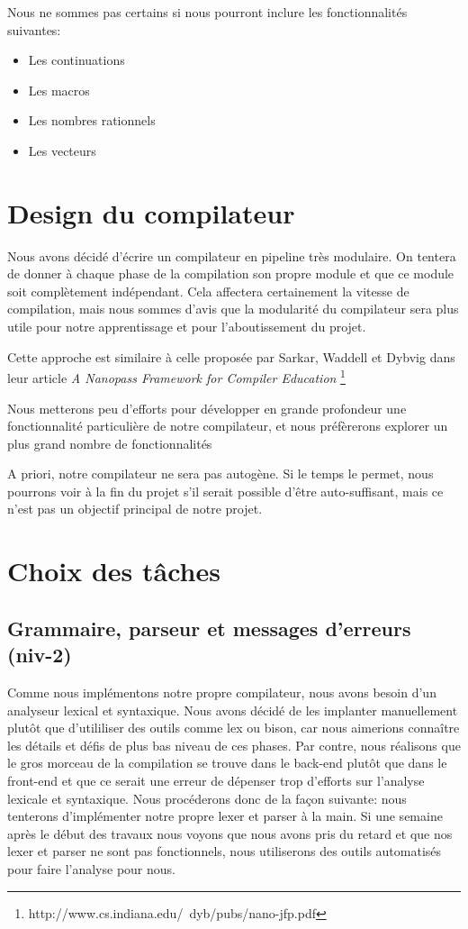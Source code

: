 \documentclass[11pt]{article}
\begin{document}
Nous ne sommes pas certains si nous pourront inclure les
fonctionnalités suivantes:

\begin{itemize}
\item Les continuations
\item Les macros
\item Les nombres rationnels
\item Les vecteurs
\end{itemize}


\section{Design du compilateur}

Nous avons décidé d'écrire un compilateur en pipeline très modulaire.
On tentera de donner à chaque phase de la compilation son propre
module et que ce module soit complètement indépendant.  Cela affectera
certainement la vitesse de compilation, mais nous sommes d'avis que la
modularité du compilateur sera plus utile pour notre apprentissage et
pour l'aboutissement du projet.

Cette approche est similaire à celle proposée par Sarkar, Waddell et
Dybvig dans leur article \emph{A Nanopass Framework for Compiler
  Education} \footnote{http://www.cs.indiana.edu/~dyb/pubs/nano-jfp.pdf}

Nous metterons peu d'efforts pour développer en grande profondeur une
fonctionnalité particulière de notre compilateur, et nous préfèrerons
explorer un plus grand nombre de fonctionnalités

A priori, notre compilateur ne sera pas autogène.  Si le temps le
permet, nous pourrons voir à la fin du projet s'il serait possible
d'être auto-suffisant, mais ce n'est pas un objectif principal de
notre projet.

\section{Choix des tâches}

\subsection{Grammaire, parseur et messages d'erreurs (niv-2)}

Comme nous implémentons notre propre compilateur, nous avons besoin
d'un analyseur lexical et syntaxique.  Nous avons décidé de les
implanter manuellement plutôt que d'utililiser des outils comme lex ou
bison, car nous aimerions connaître les détails et défis de plus bas
niveau de ces phases.  Par contre, nous réalisons que le gros morceau
de la compilation se trouve dans le back-end plutôt que dans le
front-end et que ce serait une erreur de dépenser trop d'efforts sur
l'analyse lexicale et syntaxique.  Nous procéderons donc de la façon
suivante: nous tenterons d'implémenter notre propre lexer et parser à
la main.  Si une semaine après le début des travaux nous voyons que
nous avons pris du retard et que nos lexer et parser ne sont pas
fonctionnels, nous utiliserons des outils automatisés pour faire
l'analyse pour nous.
\end{document}
